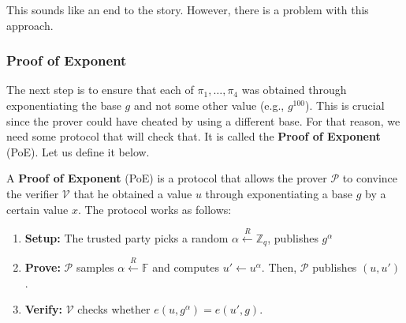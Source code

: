 \documentclass[../lecture-notes.tex]{subfiles}
\begin{document}
This sounds like an end to the story. However, there is a problem with this approach. 

\subsubsection{Proof of Exponent}

The next step is to ensure that each of $\pi_1,\dots,\pi_4$ was obtained through exponentiating the base $g$ and not some other value (e.g., $g^{100}$). This is crucial since the prover could have cheated by using a different base. 
For that reason, we need some protocol that will check that. It is called the \textbf{Proof of Exponent} (PoE). Let us define it below.

\begin{definition}
    A \textbf{Proof of Exponent} (PoE) is a protocol that allows the prover $\mathcal{P}$ to convince the verifier $\mathcal{V}$ that he obtained a value $u$ through exponentiating a base $g$ by a certain value $x$. The protocol works as follows:
    \begin{enumerate}
        \item \textbf{Setup:} The trusted party picks a random $\alpha \xleftarrow{R} \mathbb{Z}_q$, publishes $g^{\alpha}$
        \item \textbf{Prove:} $\mathcal{P}$ samples $\alpha \xleftarrow{R} \mathbb{F}$ and computes $u' \gets u^{\alpha}$. Then, $\mathcal{P}$ publishes $(u,u')$.
        \item \textbf{Verify:} $\mathcal{V}$ checks whether $e(u,g^{\alpha}) = e(u',g)$.
    \end{enumerate}
\end{definition}
\end{document}
